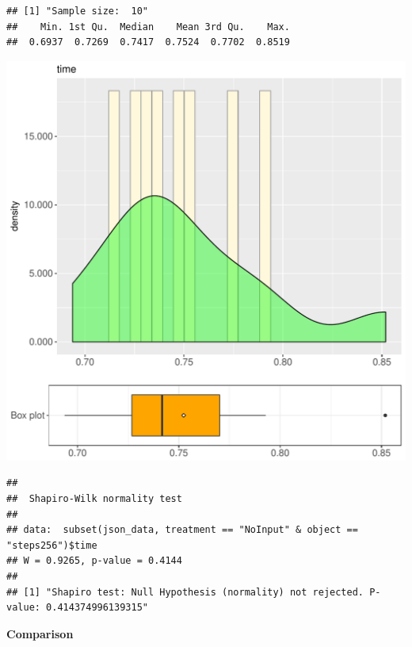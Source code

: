 \documentclass{article}\usepackage[]{graphicx}\usepackage[]{color}
\makeatletter
\def\maxwidth{ %
  \ifdim\Gin@nat@width>\linewidth
    \linewidth
  \else
    \Gin@nat@width
  \fi
}
\newenvironment{kframe}{%
 \def\at@end@of@kframe{}%
 \ifinner\ifhmode%
  \def\at@end@of@kframe{\end{minipage}}%
  \begin{minipage}{\columnwidth}%
 \fi\fi%
 \def\FrameCommand##1{\hskip\@totalleftmargin \hskip-\fboxsep
 \colorbox{shadecolor}{##1}\hskip-\fboxsep
     \hskip-\linewidth \hskip-\@totalleftmargin \hskip\columnwidth}%
 \MakeFramed {\advance\hsize-\width
   \@totalleftmargin\z@ \linewidth\hsize
   \@setminipage}}%
 {\par\unskip\endMakeFramed%
 \at@end@of@kframe}
\newenvironment{knitrout}{}{} %
\makeatother
\begin{document}
\begin{knitrout}
\color{fgcolor}\begin{kframe}
\begin{verbatim}
## [1] "Sample size:  10"
##    Min. 1st Qu.  Median    Mean 3rd Qu.    Max. 
##  0.6937  0.7269  0.7417  0.7524  0.7702  0.8519
\end{verbatim}
\end{kframe}
\includegraphics[width=\maxwidth]{figure/RH4_NoInput_steps256-1} 
\begin{kframe}\begin{verbatim}
## 
## 	Shapiro-Wilk normality test
## 
## data:  subset(json_data, treatment == "NoInput" & object == "steps256")$time
## W = 0.9265, p-value = 0.4144
## 
## [1] "Shapiro test: Null Hypothesis (normality) not rejected. P-value: 0.414374996139315"
\end{verbatim}
\end{kframe}
\end{knitrout}
  
 \textbf{Comparison}
  
\end{document}
